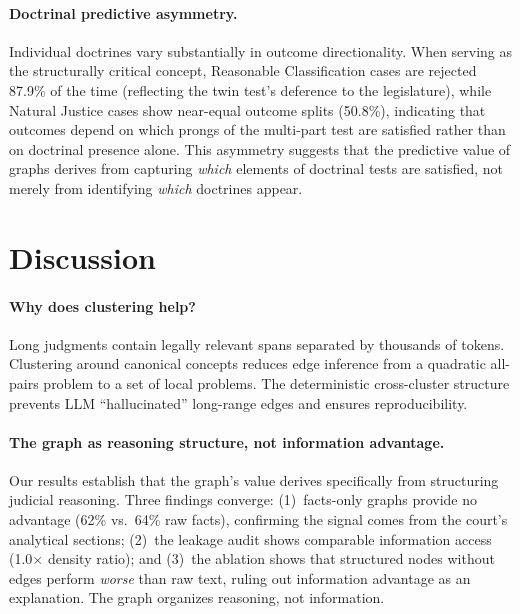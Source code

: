 \documentclass[11pt]{article}
\begin{document}
\paragraph{Doctrinal predictive asymmetry.}
Individual doctrines vary substantially in outcome directionality. When serving as the structurally critical concept, Reasonable Classification cases are rejected 87.9\% of the time (reflecting the twin test's deference to the legislature), while Natural Justice cases show near-equal outcome splits (50.8\%), indicating that outcomes depend on which prongs of the multi-part test are satisfied rather than on doctrinal presence alone. This asymmetry suggests that the predictive value of graphs derives from capturing \emph{which} elements of doctrinal tests are satisfied, not merely from identifying \emph{which} doctrines appear.

\section{Discussion}
\label{sec:discussion}

\paragraph{Why does clustering help?}
Long judgments contain legally relevant spans separated by thousands of tokens. Clustering around canonical concepts reduces edge inference from a quadratic all-pairs problem to a set of local problems. The deterministic cross-cluster structure prevents LLM ``hallucinated'' long-range edges and ensures reproducibility.

\paragraph{The graph as reasoning structure, not information advantage.}
Our results establish that the graph's value derives specifically from structuring judicial reasoning. Three findings converge: (1)~facts-only graphs provide no advantage (62\% vs.\ 64\% raw facts), confirming the signal comes from the court's analytical sections; (2)~the leakage audit shows comparable information access (1.0$\times$ density ratio); and (3)~the ablation shows that structured nodes without edges perform \emph{worse} than raw text, ruling out information advantage as an explanation. The graph organizes reasoning, not information.
\end{document}
